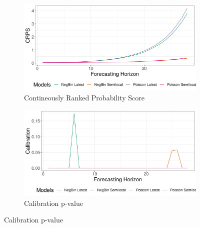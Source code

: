 \begin{figure}[H]
\begin{subfigure}{0.5\textwidth}
  \centering
  \includegraphics[width=\linewidth]{../output/Rwampara_crps.png}  
  \caption{Contineously Ranked Probability Score}
  \label{fig:sub-first}
\end{subfigure}
\begin{subfigure}{0.5\textwidth}
  \centering
  \includegraphics[width=\linewidth]{../output/Rwampara_calibration.png}  
  \caption{Calibration p-value}
  \label{fig:sub-second}
\end{subfigure}


\end{figure}
